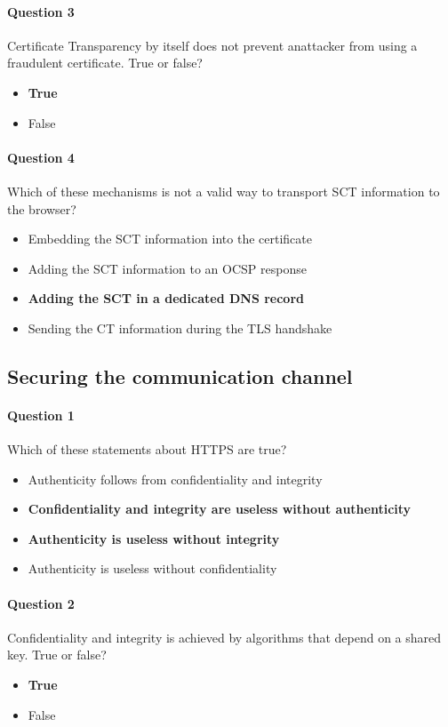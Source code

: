 \documentclass[titlepage]{article}
\begin{document}
    \paragraph{Question 3} Certificate Transparency by itself does not prevent anattacker from using a fraudulent certificate. True or false?
    \begin{itemize}
        \item \textbf{True} \checkmark
        \item False
    \end{itemize}
    \paragraph{Question 4} Which of these mechanisms is not a valid way to transport SCT information to the browser?
    \begin{itemize}
        \item Embedding the SCT information into the certificate
        \item Adding the SCT information to an OCSP response
        \item \textbf{Adding the SCT in a dedicated DNS record} \checkmark
        \item Sending the CT information during the TLS handshake
    \end{itemize}
    \subsection{Securing the communication channel}
    \paragraph{Question 1} Which of these statements about HTTPS are true?
    \begin{itemize}
        \item Authenticity follows from confidentiality and integrity
        \item \textbf{Confidentiality and integrity are useless without authenticity} \checkmark
        \item \textbf{Authenticity is useless without integrity} \checkmark
        \item Authenticity is useless without confidentiality
    \end{itemize}
    \paragraph{Question 2} Confidentiality and integrity is achieved by algorithms that depend on a shared key. True or false?
    \begin{itemize}
        \item \textbf{True} \checkmark
        \item False
    \end{itemize}
\end{document}
